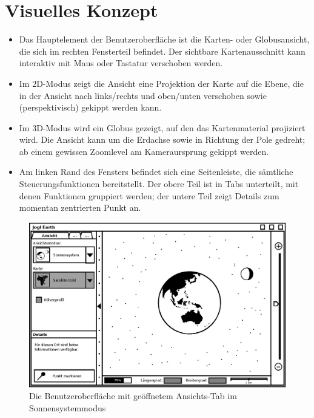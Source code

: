 \documentclass[10pt]{scrreprt}
\begin{document}
\section{Visuelles Konzept}

\begin{itemize}
	\item Das Hauptelement der Benutzeroberfläche ist die Karten- oder Globusansicht, die sich im rechten Fensterteil befindet. Der sichtbare Kartenausschnitt kann interaktiv mit Maus oder Tastatur verschoben werden.
	\item Im 2D-Modus zeigt die Ansicht eine Projektion der Karte auf die Ebene, die in der Ansicht nach links/rechts und oben/unten verschoben sowie (perspektivisch) gekippt werden kann.
	\item Im 3D-Modus wird ein Globus gezeigt, auf den das Kartenmaterial projiziert wird. Die Ansicht kann um die Erdachse sowie in Richtung der Pole gedreht; ab einem gewissen Zoomlevel am Kameraursprung gekippt werden.
	\item Am linken Rand des Fensters befindet sich eine Seitenleiste, die sämtliche Steuerungsfunktionen bereitstellt. Der obere Teil ist in Tabs unterteilt, mit denen Funktionen gruppiert werden; der untere Teil zeigt Details zum momentan zentrierten Punkt an.
\end{itemize}


\vspace{1cm}
\begin{figure}[h]
	\centering
	\includegraphics[scale=0.9]{GUI-Sonnensystem.eps}
	\caption{Die Benutzeroberfläche mit geöffnetem Ansichts-Tab im Sonnensystemmodus}
\end{figure}
\end{document}
